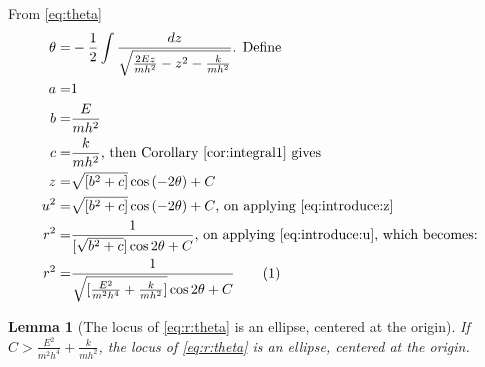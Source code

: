 \documentclass[]{article}
\newcommand\numberthis{\addtocounter{equation}{1}\tag{\theequation}}
\newtheorem{lemma}[theorem]{Lemma}
\begin{document}
From \eqref{eq:theta}
\begin{align*}
	\theta =& -\frac{1}{2}\int \frac{dz}{\sqrt{\frac{2E z}{mh^2}- z^2 - \frac{k}{mh^2} }} \text{. Define}\\
	a =& 1\\
	b =& \frac{E}{mh^2}\\
	c =& \frac{k}{mh^2} \text{, then Corollary \ref{cor:integral1} gives}\\
	z =& \sqrt{[b^2 +c]}\cos{(-2\theta) + C}\\
	u^2 =& \sqrt{[b^2 +c]}\cos{(-2\theta) + C} \text{, on applying \ref{eq:introduce:z}}\\
	r^2 =& \frac{1}{[\sqrt{b^2 +c}]\cos{2\theta + C}} \text{, on applying \ref{eq:introduce:u}, which becomes:}\\
	r^2 =& \frac{1}{\sqrt{[\frac{E^2}{m^2 h^4} +\frac{k}{m h^2}]}\cos{2\theta+ C}} \numberthis \label{eq:r:theta}
\end{align*}

\begin{lemma}[The locus of \eqref{eq:r:theta} is an ellipse, centered at the origin]\label{lem:ellipse}
	If $C > \frac{E^2}{m^2 h^4} + \frac{k}{m h^2}$, the locus of \eqref{eq:r:theta} is an ellipse, centered at the origin.
\end{lemma}
\end{document}
